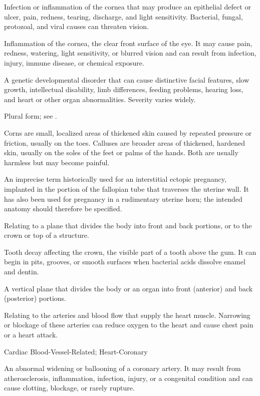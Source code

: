  Infection or inflammation of the cornea that may produce an epithelial defect or ulcer, pain, redness, tearing, discharge, and light sensitivity. Bacterial, fungal, protozoal, and viral causes can threaten vision.

 Inflammation of the cornea, the clear front surface of the eye. It may cause pain, redness, watering, light sensitivity, or blurred vision and can result from infection, injury, immune disease, or chemical exposure.

 A genetic developmental disorder that can cause distinctive facial features, slow growth, intellectual disability, limb differences, feeding problems, hearing loss, and heart or other organ abnormalities. Severity varies widely.

 Plural form; see .

 Corns are small, localized areas of thickened skin caused by repeated pressure or friction,
usually on the toes. Calluses are broader areas of thickened, hardened skin, usually on the
soles of the feet or palms of the hands. Both are usually harmless but may become painful.

 An imprecise term historically used for an
interstitial ectopic pregnancy, implanted in the portion of the fallopian tube
that traverses the uterine wall. It has also been used for pregnancy in a
rudimentary uterine horn; the intended anatomy should therefore be specified.

 Relating to a plane that divides the body into front and back portions, or to the crown or top of a structure.

 Tooth decay affecting the crown, the visible part of a tooth above the gum. It can begin in pits, grooves, or smooth surfaces when bacterial acids dissolve enamel and dentin.

 A vertical plane that divides the body or an organ into front (anterior) and back
(posterior) portions.

 Relating to the arteries and blood flow that supply the heart muscle. Narrowing or blockage of these arteries can reduce oxygen to the heart and cause chest pain or a heart attack.

\synonyms
Cardiac Blood-Vessel-Related; Heart-Coronary

 An abnormal widening or ballooning of a coronary artery. It may result from atherosclerosis, inflammation, infection, injury, or a congenital condition and can cause clotting, blockage, or rarely rupture.

